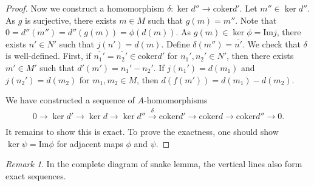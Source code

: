 \documentclass[12pt]{report}
\theoremstyle{plain}
\theoremstyle{remark}
\newtheorem*{remark}{Remark}
\theoremstyle{definition}
\begin{document}
\begin{proof}
    Now we construct a homomorphism $\delta:\ker d''\rightarrow \mathrm{coker}d'$. Let $m''\in \ker d''$. As $g$ is surjective, there exists $m\in M$ such that $g(m)=m''$. Note that $0=d''(m'')=d''(g(m)) = \phi(d(m))$. As $g(m)\in \ker \phi = \mathrm{Im}j$, there exists $n'\in N'$ such that $j(n')=d(m)$. Define $\delta(m'')=\overline{n'}$. We check that $\delta$ is well-defined. First, if $\overline{n_1'}=\overline{n_2'}\in \mathrm{coker}d'$ for $n_1',n_2'\in N'$, then there exists $m'\in M'$ such that $d'(m')=n_1'-n_2'$. If $j(n_1') =d(m_1)$ and $j(n_2')=d(m_2)$ for $m_1,m_2\in M$, then $d(f(m'))=d(m_1)-d(m_2)$.

    We have constructed a sequence of $A$-homomorphisms
    \begin{align*}
        0\rightarrow \ker d'\rightarrow \ker d\rightarrow \ker d''\xrightarrow[]{\delta} \mathrm{coker} d'\rightarrow \mathrm{coker}d \rightarrow \mathrm{coker} d''\rightarrow 0.
    \end{align*}
    It remains to show this is exact. To prove the exactness, one should show $\ker \psi = \mathrm{Im}\phi$ for adjacent maps $\phi$ and $\psi$.
\end{proof}
\begin{remark}
    In the complete diagram of snake lemma, the vertical lines also form exact sequences.
\end{remark}
\end{document}
